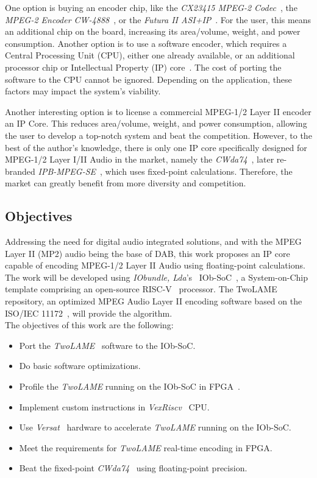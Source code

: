 One option is buying an encoder chip, like the \textit{CX23415 MPEG-2 Codec}~\cite{cx23415}, the \textit{MPEG-2 Encoder CW-4888}~\cite{cw4888}, or the \textit{Futura II ASI+IP}~\cite{futura}. For the user, this means an additional chip on the board, increasing its area/volume, weight, and power consumption. Another option is to use a software encoder, which requires a Central Processing Unit (CPU), either one already available, or an additional processor chip or Intellectual Property (IP) core~\cite{ipcore}. The cost of porting the software to the CPU cannot be ignored. Depending on the application, these factors may impact the system's viability.

Another interesting option is to license a commercial MPEG-1/2 Layer II encoder an IP Core. This reduces area/volume, weight, and power consumption, allowing the user to develop a top-notch system and beat the competition. However, to the best of the author's knowledge, there is only one IP core specifically designed for MPEG-1/2 Layer I/II Audio in the market, namely the \textit{CWda74}~\cite{CWda74}, later re-branded \textit{IPB-MPEG-SE}~\cite{ipb-mpeg-se}, which uses fixed-point calculations. Therefore, the market can greatly benefit from more diversity and competition.

\subsection{Objectives}

Addressing the need for digital audio integrated solutions, and with the MPEG Layer II (MP2) audio being the base of DAB, this work proposes an IP core capable of encoding MPEG-1/2 Layer II Audio using floating-point calculations.
The work will be developed using \textit{IObundle, Lda}'s~\cite{iobundle} IOb-SoC~\cite{bib:iobsoc-github}, a System-on-Chip template comprising an open-source RISC-V~\cite{riscv} processor. The TwoLAME~\cite{twolamerepo} repository, an optimized MPEG Audio Layer II encoding software based on the ISO/IEC 11172~\cite{11172}, will provide the algorithm.\\
The objectives of this work are the following:

\begin{itemize}
    \item Port the \textit{TwoLAME}~\cite{twolame} software to the IOb-SoC.
    \item Do basic software optimizations.
    \item Profile the \textit{TwoLAME} running on the IOb-SoC in FPGA~\cite{fpga}.
    \item Implement custom instructions in \textit{VexRiscv}~\cite{vexriscv} CPU. 
    \item Use \textit{Versat}~\cite{bib:iobversat} hardware to accelerate \textit{TwoLAME} running on the IOb-SoC.
    \item Meet the requirements for \textit{TwoLAME} real-time encoding in FPGA.
    \item Beat the fixed-point \textit{CWda74}~\cite{CWda74} using floating-point precision.
\end{itemize}

